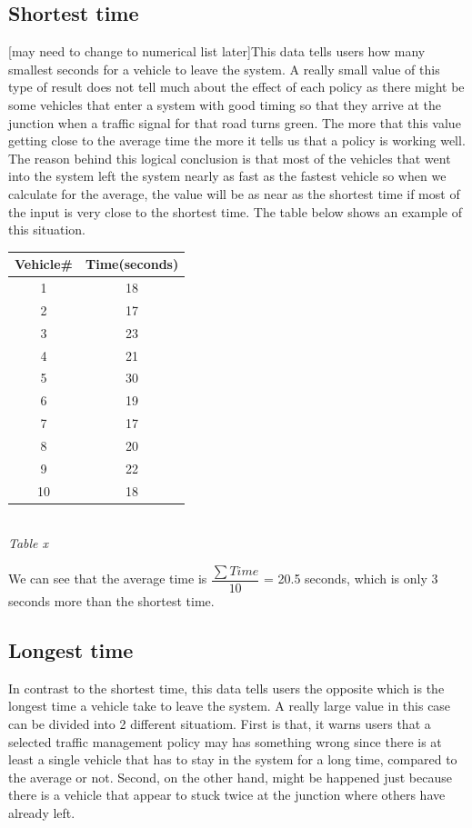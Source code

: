 \documentclass[11pt]{article}
\begin{document}
\subsection{Shortest time}
	[may need to change to numerical list later]This data tells users how many smallest seconds for a vehicle to leave the system. A really small value of this type of result does not tell much about the effect of each policy as there might be some vehicles that enter a system with good timing so that they arrive at the junction when a traffic signal for that road turns green. The more that this value getting close to the average time the more it tells us that a policy is working well. The reason behind this logical conclusion is that most of the vehicles that went into the system left the system nearly as fast as the fastest vehicle so when we calculate for the average, the value will be as near as the shortest time if most of the input is very close to the shortest time. The table below shows an example of this situation.
\\
\begin{center}
	\begin{tabular}{c c}
		\hline
		Vehicle\# & Time(seconds)\\ \hline
		1 & 18 \\
		2 & 17 \\
		3 & 23 \\
		4 & 21 \\
		5 & 30 \\
		6 & 19 \\
		7 & 17 \\
		8 & 20 \\
		9 & 22 \\
		10 & 18 \\ \hline
	\end{tabular}
	\\[0.1 cm]
	\textit{Table x}
\end{center}
We can see that the average	time is $ \dfrac{\sum{Time}}{10} $ = 20.5 seconds, which is only 3 seconds more than the shortest time.
\subsection{Longest time}
	In contrast to the shortest time, this data tells users the opposite which is the longest time a vehicle take to leave the system. A really large value in this case can be divided into 2 different situatiom. First is that, it warns users that a selected traffic management policy may has something wrong since there is at least a single vehicle that has to stay in the system for a long time, compared to the average or not. Second, on the other hand, might be happened just because there is a vehicle that appear to stuck twice at the junction where others have already left.
\end{document}
